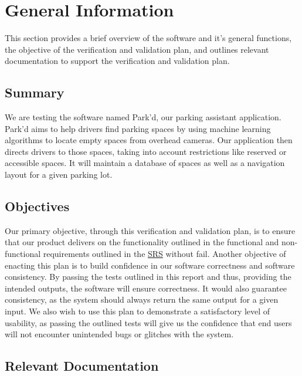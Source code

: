 \documentclass[12pt, titlepage]{article}
\begin{document}
\section{General Information}
This section provides a brief overview of the software and it's general
functions, the objective of the verification and validation plan, and outlines
relevant documentation to support the verification and validation plan.
\subsection{Summary}
We are testing the software named Park'd, our parking assistant application.
Park'd aims to help drivers find parking spaces by using machine learning
algorithms to locate empty spaces from overhead cameras. Our application then
directs drivers to those spaces, taking into account restrictions like reserved
or accessible spaces. It will maintain a database of spaces as well as a
navigation layout for a given parking lot.


\subsection{Objectives}
Our primary objective, through this verification and validation plan, is to
ensure that our product delivers on the functionality outlined in the functional
and non-functional requirements outlined in the
\href{https://github.com/parkd-app/park-d/blob/main/docs/SRS/SRS.pdf}{SRS}
without fail. Another objective of enacting this plan is to build confidence in
our software correctness and software consistency. By passing the tests outlined
in this report and thus, providing the intended outputs, the software will
ensure correctness. It would also guarantee consistency, as the system should
always return the same output for a given input. We also wish to use this plan
to demonstrate a satisfactory level of usability, as passing the outlined tests
will give us the confidence that end users will not encounter unintended bugs or
glitches with the system.

\subsection{Relevant Documentation}

\end{document}

